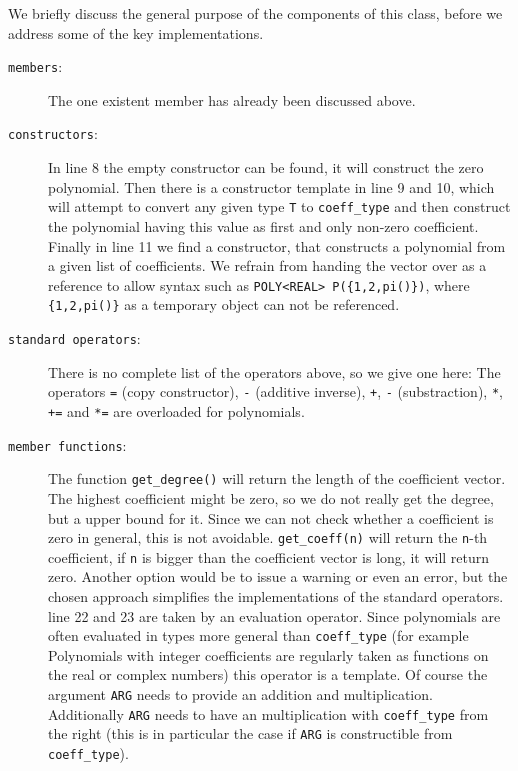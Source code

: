 \documentclass{article}
\newcommand{\code}[1]{\texttt{#1}}
\begin{document}
We briefly discuss the general purpose of the components of this class, before we address some of the key implementations.
\begin{description}
\item[\code{members}:] The one existent member has already been discussed above.
\item[\code{constructors}:] In line 8 the empty constructor can be found, it will construct the zero polynomial. Then there is a constructor template in line 9 and 10, which will attempt to convert any given type \code{T} to \code{coeff\_type} and then construct the polynomial having this value as first and only non-zero coefficient. Finally in line 11 we find a constructor, that constructs a polynomial from a given list of coefficients. We refrain from handing the vector over as a reference to allow syntax such as \code{POLY<REAL> P(\{1,2,pi()\})}, where \code{\{1,2,pi()\}} as a temporary object can not be referenced.
\item[\code{standard operators}:] There is no complete list of the operators above, so we give one here: The operators \code{=} (copy constructor), \code{-} (additive inverse), \code{+}, \code{-} (substraction), \code{*}, \code{+=} and \code{*=} are overloaded for polynomials.
\item[\code{member functions}:] The function \code{get\_degree()} will return the length of the coefficient vector. The highest coefficient might be zero, so we do not really get the degree, but a upper bound for it. Since we can not check whether a coefficient is zero in general, this is not avoidable. \code{get\_coeff(n)} will return the \code{n}-th coefficient, if \code{n} is bigger than the coefficient vector is long, it will return zero. Another option would be to issue a warning or even an error, but the chosen approach simplifies the implementations of the standard operators. line 22 and 23 are taken by an evaluation operator. Since polynomials are often evaluated in types more general than \code{coeff\_type} (for example Polynomials with integer coefficients are regularly taken as functions on the real or complex numbers) this operator is a template. Of course the argument \code{ARG} needs to provide an addition and multiplication. Additionally \code{ARG} needs to have an multiplication with \code{coeff\_type} from the right (this is in particular the case if \code{ARG} is constructible from \code{coeff\_type}).
\end{description}
\end{document}

